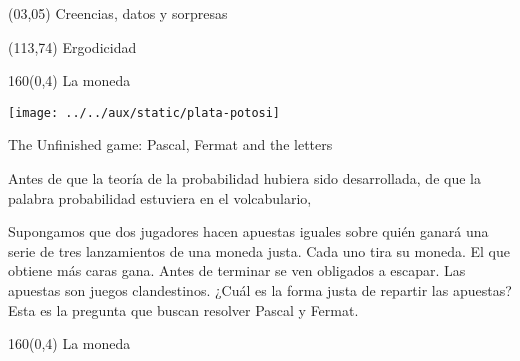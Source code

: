 \documentclass[shownotes,aspectratio=169]{beamer}
\begin{document}
\color{black!85}
\large

 

\begin{frame}
 
 \begin{textblock}{90}(03,05)
 \centering \huge  \textcolor{black!40}{Creencias, datos y sorpresas}
\end{textblock}

 \begin{textblock}{47}(113,74)
\centering \Large  \textcolor{white!55}{Ergodicidad}
\end{textblock}

{}
\end{frame}




\begin{frame}[plain]
 \begin{textblock}{160}(0,4)
  \centering \LARGE La moneda
 \end{textblock}

\vspace{1cm}

\texttt{[image: ../../aux/static/plata-potosi]}
 
\end{frame}


\begin{frame}[plain]
 The Unfinished game: Pascal, Fermat and the letters

 Antes de que la teoría de la probabilidad hubiera sido desarrollada, de que la palabra probabilidad estuviera en el volcabulario, 

Supongamos que dos jugadores hacen apuestas iguales sobre quién ganará una serie de tres lanzamientos de una moneda justa.
Cada uno tira su moneda.
El que obtiene más caras gana.
Antes de terminar se ven obligados a escapar. 
Las apuestas son juegos clandestinos.
¿Cuál es la forma justa de repartir las apuestas?
Esta es la pregunta que buscan resolver Pascal y Fermat.
 
\end{frame}

\begin{frame}[plain]
 \begin{textblock}{160}(0,4)
  \centering \LARGE La moneda
 \end{textblock}

\vspace{1cm}


\end{frame}
\end{document}
